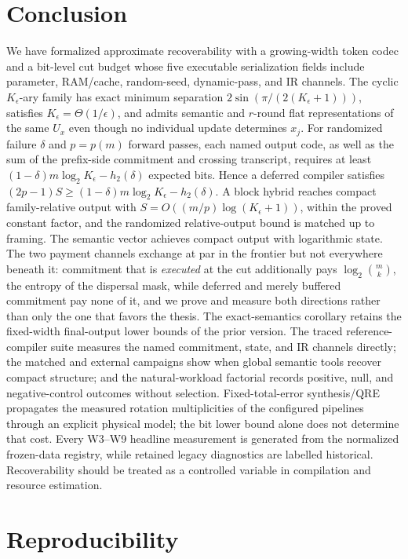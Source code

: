 \documentclass[a4paper,twocolumn,10pt,unpublished]{quantumarticle}
\begin{document}
\section{Conclusion}
\label{sec:conclusion}

We have formalized approximate recoverability with a growing-width token
codec and a bit-level cut budget whose five executable serialization fields
include parameter, RAM/cache, random-seed, dynamic-pass, and IR channels.
The cyclic $K_\epsilon$-ary family has exact minimum separation
$2\sin(\pi/(2(K_\epsilon+1)))$, satisfies
$K_\epsilon=\Theta(1/\epsilon)$, and admits semantic and $r$-round flat
representations of the same $U_x$ even though no individual update
determines $x_j$.  For randomized failure $\delta$ and $p=p(m)$ forward
passes, each named output code, as well as the sum of the prefix-side
commitment and crossing transcript, requires at least
$(1-\delta)m\log_2K_\epsilon-h_2(\delta)$ expected bits.  Hence a deferred
compiler satisfies $(2p-1)S\geq
(1-\delta)m\log_2K_\epsilon-h_2(\delta)$.  A block hybrid reaches compact
family-relative output with
$S=O((m/p)\log(K_\epsilon+1))$, within the proved constant factor, and the
randomized relative-output bound is matched up to framing.  The semantic
vector achieves compact output with logarithmic state.  The two payment
channels exchange at par in the frontier but not everywhere beneath it:
commitment that is \emph{executed} at the cut additionally pays
$\log_2\binom{m}{k}$, the entropy of the dispersal mask, while deferred and
merely buffered commitment pay none of it, and we prove and measure both
directions rather than only the one that favors the thesis.  The
exact-semantics corollary retains the fixed-width final-output lower bounds
of the prior version.  The traced reference-compiler suite measures the
named commitment, state, and IR channels directly; the matched and external
campaigns show when global semantic tools recover compact structure; and the
natural-workload factorial records positive, null, and negative-control
outcomes without selection.  Fixed-total-error synthesis/QRE propagates the
measured rotation multiplicities of the configured pipelines through an
explicit physical model; the bit lower bound alone does not determine that
cost.  Every W3--W9
headline measurement is generated from the normalized frozen-data registry,
while retained legacy diagnostics are labelled historical.  Recoverability
should be treated as a controlled variable in compilation and resource
estimation.


\section*{Reproducibility}
\label{sec:reproducibility}
\end{document}
